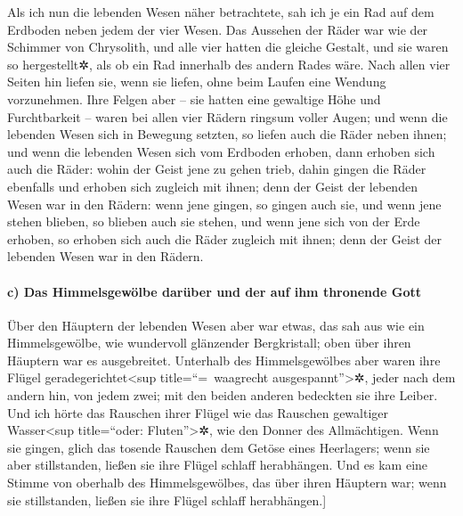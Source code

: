 Als ich nun die lebenden Wesen näher betrachtete, sah ich
je ein Rad auf dem Erdboden neben jedem der vier Wesen.
Das Aussehen der Räder war wie der Schimmer von
Chrysolith, und alle vier hatten die gleiche Gestalt, und sie waren so
hergestellt✲, als ob ein Rad innerhalb des andern Rades wäre.
Nach allen vier Seiten hin liefen sie, wenn sie liefen,
ohne beim Laufen eine Wendung vorzunehmen. Ihre Felgen
aber -- sie hatten eine gewaltige Höhe und Furchtbarkeit -- waren bei
allen vier Rädern ringsum voller Augen; und wenn die
lebenden Wesen sich in Bewegung setzten, so liefen auch die Räder neben
ihnen; und wenn die lebenden Wesen sich vom Erdboden erhoben, dann
erhoben sich auch die Räder: wohin der Geist jene zu
gehen trieb, dahin gingen die Räder ebenfalls und erhoben sich zugleich
mit ihnen; denn der Geist der lebenden Wesen war in den Rädern:
wenn jene gingen, so gingen auch sie, und wenn jene
stehen blieben, so blieben auch sie stehen, und wenn jene sich von der
Erde erhoben, so erhoben sich auch die Räder zugleich mit ihnen; denn
der Geist der lebenden Wesen war in den Rädern.

\hypertarget{c-das-himmelsgewuxf6lbe-daruxfcber-und-der-auf-ihm-thronende-gott}{%
\paragraph{c) Das Himmelsgewölbe darüber und der auf ihm thronende
Gott}\label{c-das-himmelsgewuxf6lbe-daruxfcber-und-der-auf-ihm-thronende-gott}}

Über den Häuptern der lebenden Wesen aber war etwas, das
sah aus wie ein Himmelsgewölbe, wie wundervoll glänzender Bergkristall;
oben über ihren Häuptern war es ausgebreitet. Unterhalb
des Himmelsgewölbes aber waren ihre Flügel geradegerichtet\textless sup
title=``=~waagrecht ausgespannt''\textgreater✲, jeder nach dem andern
hin, von jedem zwei; mit den beiden anderen bedeckten sie ihre Leiber.
Und ich hörte das Rauschen ihrer Flügel wie das Rauschen
gewaltiger Wasser\textless sup title=``oder: Fluten''\textgreater✲, wie
den Donner des Allmächtigen. Wenn sie gingen, glich das tosende Rauschen
dem Getöse eines Heerlagers; wenn sie aber stillstanden, ließen sie ihre
Flügel schlaff herabhängen. \bibleverse{25}{[}Und es kam eine Stimme von
oberhalb des Himmelsgewölbes, das über ihren Häuptern war; wenn sie
stillstanden, ließen sie ihre Flügel schlaff herabhängen.{]}

